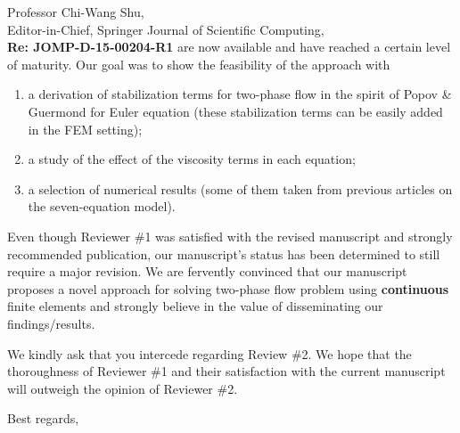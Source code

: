 \documentclass[11pt]{letter}
\begin{document}
\begin{letter}{Professor Chi-Wang Shu, \\  Editor-in-Chief, Springer Journal of Scientific Computing,\\
\textbf{Re: JOMP-D-15-00204-R1}}
are now available and have reached a certain level of maturity. Our goal was to show the feasibility of the approach with 
\begin{enumerate}
\item
a derivation of stabilization terms for two-phase flow in the spirit of Popov \& Guermond for Euler equation (these stabilization terms can be easily added in the FEM setting);
\item
a study of the effect of the viscosity terms in each equation;
\item 
a selection of numerical results (some of them taken from previous articles on the seven-equation model).
\end{enumerate}
 

\bigskip
Even though Reviewer \#1 was
satisfied with the revised manuscript and strongly recommended publication, our manuscript's status has been 
determined to still require a major revision. We are fervently
convinced that our manuscript proposes a novel approach for solving two-phase flow problem using {\bf continuous}
finite elements and strongly believe in the value of disseminating our findings/results. 

We kindly ask that you intercede regarding Review \#2.
We hope that the thoroughness of Reviewer \#1 and their
satisfaction with the current manuscript will outweigh the 
opinion of Reviewer \#2.



\closing{Best regards, }

\end{letter}
\end{document}
